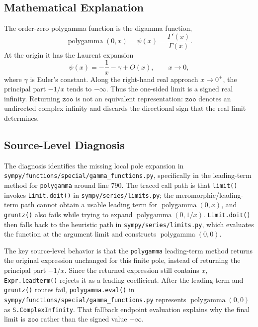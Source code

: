 \documentclass[11pt]{article}
\begin{document}
\subsection{Mathematical Explanation}

The order-zero polygamma function is the digamma function,
\[
  \operatorname{polygamma}(0,x)=\psi(x)=\frac{\Gamma'(x)}{\Gamma(x)}.
\]
At the origin it has the Laurent expansion
\[
  \psi(x) = -\frac{1}{x} - \gamma + O(x),
  \qquad x \to 0,
\]
where \(\gamma\) is Euler's constant. Along the right-hand real approach \(x \to 0^+\), the principal part \(-1/x\) tends to \(-\infty\). Thus the one-sided limit is a signed real infinity. Returning \(\mathtt{zoo}\) is not an equivalent representation: \(\mathtt{zoo}\) denotes an undirected complex infinity and discards the directional sign that the real limit determines.

\subsection{Source-Level Diagnosis}

\begin{sloppypar}
The diagnosis identifies the missing local pole expansion in \nolinkurl{sympy/functions/special/gamma_functions.py}, specifically in the leading-term method for \texttt{polygamma} around line 790. The traced call path is that \texttt{limit()} invokes \texttt{Limit.doit()} in \nolinkurl{sympy/series/limits.py}; the meromorphic/leading-term path cannot obtain a usable leading term for \(\operatorname{polygamma}(0,x)\), and \texttt{gruntz()} also fails while trying to expand \(\operatorname{polygamma}(0,1/x)\). \texttt{Limit.doit()} then falls back to the heuristic path in \nolinkurl{sympy/series/limits.py}, which evaluates the function at the argument limit and constructs \(\operatorname{polygamma}(0,0)\).
\end{sloppypar}

The key source-level behavior is that the \texttt{polygamma} leading-term method returns the original expression unchanged for this finite pole, instead of returning the principal part \(-1/x\). Since the returned expression still contains \(x\), \texttt{Expr.leadterm()} rejects it as a leading coefficient. After the leading-term and \texttt{gruntz()} routes fail, \texttt{polygamma.eval()} in \nolinkurl{sympy/functions/special/gamma_functions.py} represents \(\operatorname{polygamma}(0,0)\) as \texttt{S.ComplexInfinity}. That fallback endpoint evaluation explains why the final limit is \(\mathtt{zoo}\) rather than the signed value \(-\infty\).
\end{document}
